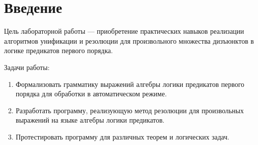 \chapter*{Введение}

Цель лабораторной работы --- приобретение практических навыков реализации алгоритмов унификации и резолюции для произвольного множества дизъюнктов в логике предикатов первого порядка.

Задачи работы:
\begin{enumerate}
    \item Формализовать грамматику выражений алгебры логики предикатов первого порядка для обработки в автоматическом режиме.
    \item Разработать программу, реализующую метод резолюции для произвольных выражений на языке алгебры логики предикатов.
    \item Протестировать программу для различных теорем и логических задач.
\end{enumerate}
